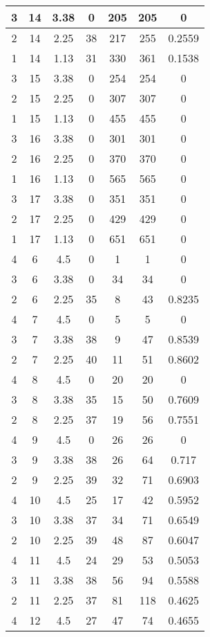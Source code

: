 \documentclass[letterpaper, 12pt]{article}
\begin{document}
\begin{longtable}{|c|c|c|c|c|c|c|}
\hline
3 & 14 & 3.38 & 0 & 205 & 205 & 0 \\
\hline
2 & 14 & 2.25 & 38 & 217 & 255 & 0.2559 \\
\hline
1 & 14 & 1.13 & 31 & 330 & 361 & 0.1538 \\
\hline
3 & 15 & 3.38 & 0 & 254 & 254 & 0 \\
\hline
2 & 15 & 2.25 & 0 & 307 & 307 & 0 \\
\hline
1 & 15 & 1.13 & 0 & 455 & 455 & 0 \\
\hline
3 & 16 & 3.38 & 0 & 301 & 301 & 0 \\
\hline
2 & 16 & 2.25 & 0 & 370 & 370 & 0 \\
\hline
1 & 16 & 1.13 & 0 & 565 & 565 & 0 \\
\hline
3 & 17 & 3.38 & 0 & 351 & 351 & 0 \\
\hline
2 & 17 & 2.25 & 0 & 429 & 429 & 0 \\
\hline
1 & 17 & 1.13 & 0 & 651 & 651 & 0 \\
\hline
4 & 6 & 4.5 & 0 & 1 & 1 & 0 \\
\hline
3 & 6 & 3.38 & 0 & 34 & 34 & 0 \\
\hline
2 & 6 & 2.25 & 35 & 8 & 43 & 0.8235 \\
\hline
4 & 7 & 4.5 & 0 & 5 & 5 & 0 \\
\hline
3 & 7 & 3.38 & 38 & 9 & 47 & 0.8539 \\
\hline
2 & 7 & 2.25 & 40 & 11 & 51 & 0.8602 \\
\hline
4 & 8 & 4.5 & 0 & 20 & 20 & 0 \\
\hline
3 & 8 & 3.38 & 35 & 15 & 50 & 0.7609 \\
\hline
2 & 8 & 2.25 & 37 & 19 & 56 & 0.7551 \\
\hline
4 & 9 & 4.5 & 0 & 26 & 26 & 0 \\
\hline
3 & 9 & 3.38 & 38 & 26 & 64 & 0.717 \\
\hline
2 & 9 & 2.25 & 39 & 32 & 71 & 0.6903 \\
\hline
4 & 10 & 4.5 & 25 & 17 & 42 & 0.5952 \\
\hline
3 & 10 & 3.38 & 37 & 34 & 71 & 0.6549 \\
\hline
2 & 10 & 2.25 & 39 & 48 & 87 & 0.6047 \\
\hline
4 & 11 & 4.5 & 24 & 29 & 53 & 0.5053 \\
\hline
3 & 11 & 3.38 & 38 & 56 & 94 & 0.5588 \\
\hline
2 & 11 & 2.25 & 37 & 81 & 118 & 0.4625 \\
\hline
4 & 12 & 4.5 & 27 & 47 & 74 & 0.4655 \\

\end{longtable}
\end{document}
